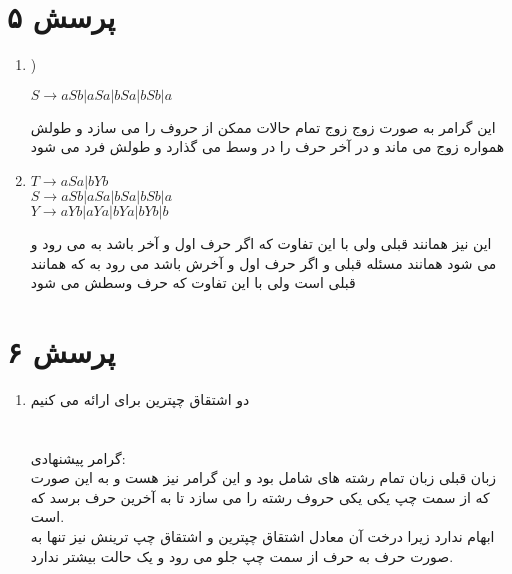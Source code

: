 \documentclass[a4paper]{article}
\begin{document}
\section*{پرسش ۵}
\begin{enumerate}[label=\Alph*]
\item{)}
\begin{latin}
$S \rightarrow aSb|aSa|bSa|bSb|a$\\
\end{latin}
این گرامر به صورت زوج زوج تمام حالات ممکن از حروف 
را می سازد و طولش همواره زوج می ماند و در آخر حرف
را در وسط می گذارد و طولش فرد می شود

\item{}
\begin{latin}

$T\rightarrow aSa|bYb$\\
$S \rightarrow aSb|aSa|bSa|bSb|a$\\
$Y \rightarrow aYb|aYa|bYa|bYb|b$\\
\end{latin}

این نیز همانند قبلی ولی با این تفاوت که اگر حرف اول و آخر 
باشد به 
می رود و می شود همانند مسئله قبلی و اگر حرف اول و آخرش 
باشد می رود به
که همانند قبلی است ولی با این تفاوت که حرف وسطش می شود

\end{enumerate}
\pagebreak

\section*{پرسش ۶}
\begin{enumerate}
\item{}
دو اشتقاق چپترین برای
ارائه می کنیم\\
\\
\\

گرامر پیشنهادی:
\\
زبان قبلی زبان تمام رشته های شامل
بود و این گرامر نیز هست و به این صورت که از سمت چپ یکی یکی حروف رشته را می سازد تا به آخرین حرف برسد که
است.\\
ابهام ندارد زیرا درخت آن معادل اشتقاق چپترین و اشتقاق چپ ترینش نیز تنها به صورت حرف به حرف از سمت چپ جلو می رود و یک حالت بیشتر ندارد.

\end{enumerate}
\end{document}
